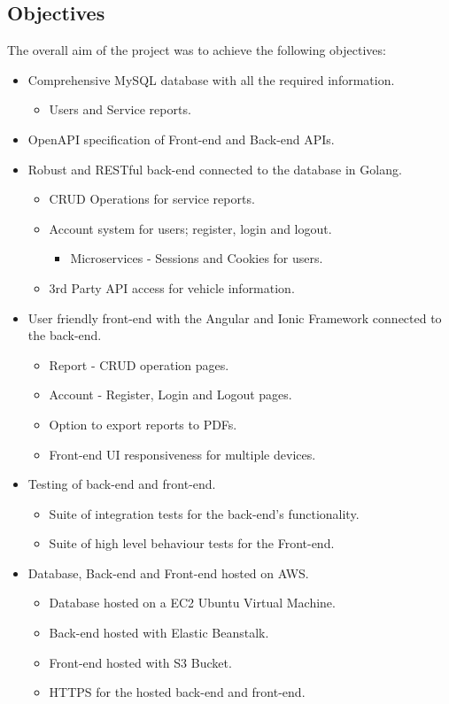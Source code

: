\subsection{Objectives}
The overall aim of the project was to achieve the following objectives: 
\begin{itemize}
    \item Comprehensive MySQL database with all the required information.
     \begin{itemize} 
        \item Users and Service reports.
    \end{itemize}
    \item OpenAPI specification of Front-end and Back-end APIs.
    \item Robust and RESTful back-end connected to the database in Golang.
    \begin{itemize} 
        \item CRUD Operations for service reports.
        \item Account system for users; register, login and logout.
        \begin{itemize} 
            \item Microservices - Sessions and Cookies for users.
        \end{itemize}
        \item 3rd Party API access for vehicle information.
    \end{itemize}
    \item User friendly front-end with the Angular and Ionic Framework connected to the back-end.
    \begin{itemize} 
        \item Report - CRUD operation pages.
        \item Account - Register, Login and Logout pages.
        \item Option to export reports to PDFs.
        \item Front-end UI responsiveness for multiple devices.
    \end{itemize}
    \item Testing of back-end and front-end.
    \begin{itemize}
        \item Suite of integration tests for the back-end's functionality.
        \item Suite of high level behaviour tests for the Front-end.
    \end{itemize}
    \item Database, Back-end and Front-end hosted on AWS.
    \begin{itemize} 
        \item Database hosted on a EC2 Ubuntu Virtual Machine.
        \item Back-end hosted with Elastic Beanstalk.
        \item Front-end hosted with S3 Bucket.
        \item HTTPS for the hosted back-end and front-end.
    \end{itemize}
\end{itemize}

